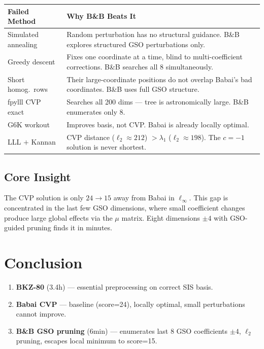 \documentclass[11pt,a4paper]{article}
\begin{document}
\begin{center}
\begin{tabularx}{\textwidth}{>{\raggedright\arraybackslash}p{3.5cm}>{\raggedright\arraybackslash}X}
\toprule
Failed Method & Why B\&B Beats It \\
\midrule
Simulated annealing &
  Random perturbation has no structural guidance. B\&B explores structured GSO perturbations only. \\
\midrule
Greedy descent &
  Fixes one coordinate at a time, blind to multi-coefficient corrections. B\&B searches all 8 simultaneously. \\
\midrule
Short homog.\ rows &
  Their large-coordinate positions do not overlap Babai's bad coordinates. B\&B uses full GSO structure. \\
\midrule
fpylll CVP exact &
  Searches all 200 dims --- tree is astronomically large. B\&B enumerates only 8. \\
\midrule
G6K workout &
  Improves basis, not CVP. Babai is already locally optimal. \\
\midrule
LLL $+$ Kannan &
  CVP distance ($\ell_2\approx212$) $> \lambda_1$ ($\ell_2\approx198$). The $c=-1$ solution is never shortest. \\
\bottomrule
\end{tabularx}
\end{center}

\subsection{Core Insight}
The CVP solution is only $24\to15$ away from Babai in $\ell_\infty$. This gap is concentrated in the last few GSO dimensions, where small coefficient changes produce large global effects via the $\mu$ matrix. Eight dimensions $\pm4$ with GSO-guided pruning finds it in minutes.

\section{Conclusion}
\begin{enumerate}
  \item \textbf{BKZ-80} (3.4h) --- essential preprocessing on correct SIS basis.
  \item \textbf{Babai CVP} --- baseline (score=24), locally optimal, small perturbations cannot improve.
  \item \textbf{B\&B GSO pruning} (6min) --- enumerates last 8 GSO coefficients $\pm4$, $\ell_2$ pruning, escapes local minimum to score=15.
\end{enumerate}
\end{document}
